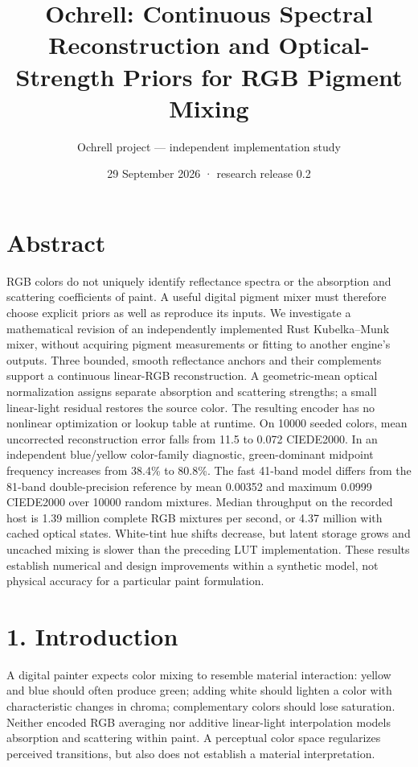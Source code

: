 \documentclass[
  10pt,
  twocolumn]{article}
\title{Ochrell: Continuous Spectral Reconstruction and Optical-Strength
Priors for RGB Pigment Mixing}
\author{Ochrell project --- independent implementation study}
\date{29 September 2026 · research release 0.2}
\begin{document}
\maketitle

\hypertarget{abstract}{%
\section{Abstract}\label{abstract}}

RGB colors do not uniquely identify reflectance spectra or the
absorption and scattering coefficients of paint. A useful digital
pigment mixer must therefore choose explicit priors as well as reproduce
its inputs. We investigate a mathematical revision of an independently
implemented Rust Kubelka--Munk mixer, without acquiring pigment
measurements or fitting to another engine's outputs. Three bounded,
smooth reflectance anchors and their complements support a continuous
linear-RGB reconstruction. A geometric-mean optical normalization
assigns separate absorption and scattering strengths; a small
linear-light residual restores the source color. The resulting encoder
has no nonlinear optimization or lookup table at runtime. On 10000
seeded colors, mean uncorrected reconstruction error falls from 11.5 to
0.072 CIEDE2000. In an independent blue/yellow color-family diagnostic,
green-dominant midpoint frequency increases from 38.4\% to 80.8\%. The
fast 41-band model differs from the 81-band double-precision reference
by mean 0.00352 and maximum 0.0999 CIEDE2000 over 10000 random mixtures.
Median throughput on the recorded host is 1.39 million complete RGB
mixtures per second, or 4.37 million with cached optical states.
White-tint hue shifts decrease, but latent storage grows and uncached
mixing is slower than the preceding LUT implementation. These results
establish numerical and design improvements within a synthetic model,
not physical accuracy for a particular paint formulation.

\hypertarget{introduction}{%
\section{1. Introduction}\label{introduction}}

A digital painter expects color mixing to resemble material interaction:
yellow and blue should often produce green; adding white should lighten
a color with characteristic changes in chroma; complementary colors
should lose saturation. Neither encoded RGB averaging nor additive
linear-light interpolation models absorption and scattering within
paint. A perceptual color space regularizes perceived transitions, but
also does not establish a material interpretation.
\end{document}
